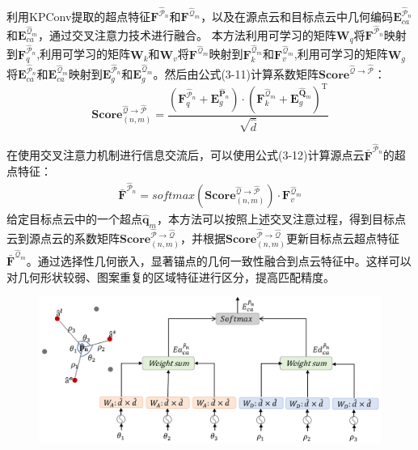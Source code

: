    利用KPConv提取的超点特征$\mathbf{F}^{\mathcal{\hat{P}}_n}$和$\mathbf{F}^{\mathcal{\hat{Q}}_m}$，以及在源点云和目标点云中几何编码$\mathbf{E}_{ca}^{\mathcal{\hat{P}}_{n}}$和$\mathbf{E}_{ca}^{\mathcal{\hat{Q}}_{m}}$，通过交叉注意力技术进行融合。
    本方法利用可学习的矩阵$\mathbf{W}_q$将$\mathbf{F}^{\mathcal{\hat{P}}_n}$映射到$\mathbf{F}_{q}^{\mathcal{\hat{P}}_n}$,利用可学习的矩阵$\mathbf{W}_k$和$\mathbf{W}_v$将$\mathbf{F}^{\mathcal{\hat{Q}}_m}$映射到$\mathbf{F}_{k}^{\mathcal{\hat{Q}}_m}$和$\mathbf{F}_{v}^{\mathcal{\hat{Q}}_m}$,利用可学习的矩阵$\mathbf{W}_g$将$\mathbf{E}_{ca}^{\mathcal{\hat{P}}_{n}}$和$\mathbf{E}_{ca}^{\mathcal{\hat{Q}}_{m}}$映射到$\mathbf{E}_{g}^{\mathcal{\hat{P}}_{n}}$和$\mathbf{E}_{g}^{\mathcal{\hat{Q}}_{m}}$。然后由公式(3-11)计算系数矩阵$\mathbf{Score}^{\mathcal{\hat{Q}}\to\mathcal{\hat{P}}}$：
    \begin{equation}
        \mathbf{Score}_{(n, m)}^{\hat{\mathcal{Q}}\to\hat{\mathcal{P}}}=
        \frac{
        {(\mathbf{F}_q^{\mathcal{\hat{P}}_n}+\mathbf{E}_g^{\mathbf{\hat{P}}_n})}\cdot
        {(\mathbf{F}_k^{\mathcal{\hat{Q}}_m}+\mathbf{E}_g^{\mathbf{\hat{Q}}_m})}^\mathrm{T}
        }{\sqrt{\hat{d}}}
    \end{equation}

    在使用交叉注意力机制进行信息交流后，可以使用公式(3-12)计算源点云$\bar{\mathbf{F}}^{\mathcal{\hat{P}}_n}$的超点特征：
    \begin{equation}
        \begin{aligned}  
        \mathbf{\bar{F}}^{\mathcal{\hat{P}}_n} = 
        softmax(\mathbf{Score}_{(n, m)}^{\mathcal{\hat{Q}}\to\mathcal{\hat{P}}})
        \cdot \mathbf{F}_v^{\mathcal{\hat{Q}}_m}
        \end{aligned}
    \end{equation}
    给定目标点云中的一个超点$\mathbf{\hat{q}}_m$，本方法可以按照上述交叉注意过程，得到目标点云到源点云的系数矩阵$\mathbf{Score}_{(n, m)}^{\mathcal{\hat{P}}\to\mathcal{\hat{Q}}}$，并根据$\mathbf{Score}_{(n, m)}^{\mathcal{\hat{P}}\to\mathcal{\hat{Q}}}$更新目标点云超点特征$\mathbf{\bar{F}}^{\mathcal{\hat{Q}}_m}$。通过选择性几何嵌入，显著锚点的几何一致性融合到点云特征中。这样可以对几何形状较弱、图案重复的区域特征进行区分，提高匹配精度。

    \vspace{-0.1cm}
    \begin{figure}[h]
        \centering
        \includegraphics[width = 12cm]{my/figure/3-4.pdf}
        \label{fig:embedding}
    \end{figure}
    \vspace{-0.35cm}

